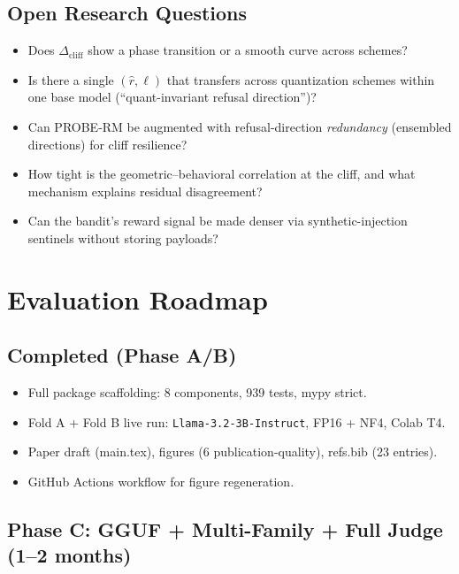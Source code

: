 \documentclass[11pt,a4paper]{article}
\newcommand{\cliff}{\Delta_{\mathrm{cliff}}}
\newcommand{\rhat}{\hat{r}}
\begin{document}
\subsection{Open Research Questions}

\begin{itemize}[leftmargin=2em, itemsep=2pt]
  \item Does $\cliff$ show a phase transition or a smooth curve across schemes?
  \item Is there a single $(\rhat, \ell)$ that transfers across quantization schemes
        within one base model (``quant-invariant refusal direction'')?
  \item Can PROBE-RM be augmented with refusal-direction \emph{redundancy}
        (ensembled directions) for cliff resilience?
  \item How tight is the geometric--behavioral correlation at the cliff, and what
        mechanism explains residual disagreement?
  \item Can the bandit's reward signal be made denser via synthetic-injection
        sentinels without storing payloads?
\end{itemize}

\section{Evaluation Roadmap}
\label{sec:roadmap}

\subsection{Completed (Phase A/B)}

\begin{itemize}[leftmargin=2em]
  \item Full package scaffolding: 8 components, 939 tests, mypy strict.
  \item Fold A + Fold B live run: \texttt{Llama-3.2-3B-Instruct}, FP16 + NF4, Colab T4.
  \item Paper draft (main.tex), figures (6 publication-quality), refs.bib (23 entries).
  \item GitHub Actions workflow for figure regeneration.
\end{itemize}

\subsection{Phase C: GGUF + Multi-Family + Full Judge (1--2 months)}
\end{document}
